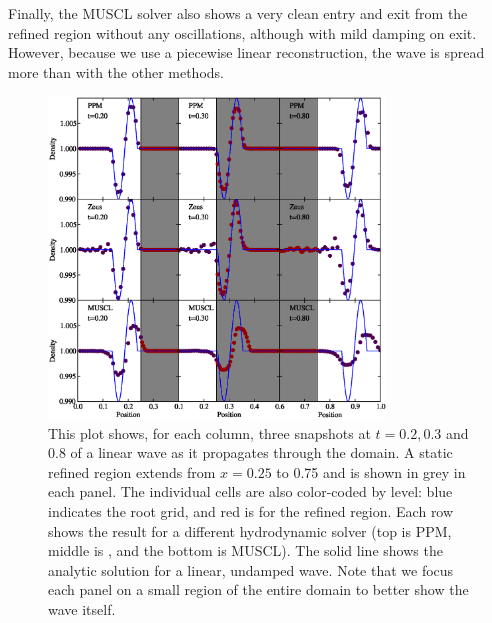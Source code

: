 Finally, the MUSCL solver also shows a very clean entry and exit from the refined region without any oscillations, although with mild damping on exit. However, because we use a piecewise linear reconstruction, the wave is spread more than with the other methods.

\begin{figure}
\begin{center}
\includegraphics[width=0.8\textwidth]{figures/WavePool.eps}
\caption{This plot shows, for each column, three snapshots at $t=0.2, 0.3$ and 0.8 of a linear wave as it propagates through the domain.  A static refined region extends from $x = 0.25$ to 0.75 and is shown in grey in each panel.  The individual cells are also color-coded by level: blue indicates the root grid, and red is for the refined region.  Each row shows the result for a different hydrodynamic solver (top is PPM, middle is \zeus, and the bottom is MUSCL).   The solid line shows the analytic solution for a linear, undamped wave.  Note that we focus each panel on a small region of the entire domain to better show the wave itself.}
\label{fig.wavepool}
\end{center}
\end{figure}
